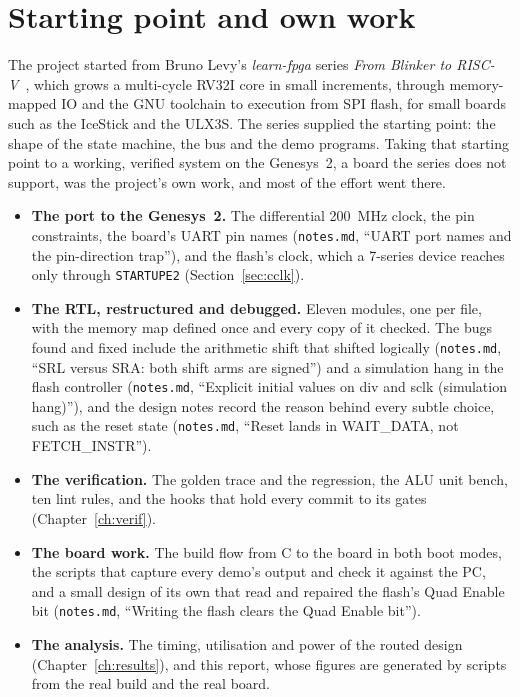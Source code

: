 \documentclass[11pt,a4paper]{report}
\newcommand{\notes}[1]{(\texttt{notes.md}, ``#1'')}
\begin{document}
\section{Starting point and own work}

The project started from Bruno Levy's \emph{learn-fpga} series \emph{From Blinker to
RISC-V}~\cite{levy-learnfpga}, which grows a multi-cycle RV32I core in small increments,
through memory-mapped IO and the GNU toolchain to execution from SPI flash, for small boards
such as the IceStick and the ULX3S. The series supplied the starting point: the shape of the
state machine, the bus and the demo programs. Taking that starting point to a working, verified
system on the Genesys~2, a board the series does not support, was the project's own work,
and most of the effort went there.

\begin{itemize}[leftmargin=*, itemsep=2pt]
  \item \textbf{The port to the Genesys~2.} The differential 200~MHz clock, the pin
    constraints, the board's UART pin names \notes{UART port names and the pin-direction trap},
    and the flash's
    clock, which a 7-series device reaches only through \texttt{STARTUPE2}
    (Section~\ref{sec:cclk}).
  \item \textbf{The RTL, restructured and debugged.} Eleven modules, one per file, with the
    memory map defined once and every copy of it checked. The bugs found and fixed include
    the arithmetic shift that shifted logically \notes{SRL versus SRA: both shift arms are
    signed} and a simulation hang in the flash controller \notes{Explicit initial values on div
    and sclk (simulation hang)}, and the design notes record the reason behind every subtle
    choice, such as the reset state \notes{Reset lands in WAIT\_DATA, not FETCH\_INSTR}.
  \item \textbf{The verification.} The golden trace and the regression, the ALU unit bench,
    ten lint rules, and the hooks that hold every commit to its gates
    (Chapter~\ref{ch:verif}).
  \item \textbf{The board work.} The build flow from C to the board in both boot modes, the
    scripts that capture every demo's output and check it against the PC, and a small design
    of its own that read and repaired the flash's Quad Enable bit \notes{Writing the flash
    clears the Quad Enable bit}.
  \item \textbf{The analysis.} The timing, utilisation and power of the routed design
    (Chapter~\ref{ch:results}), and this report, whose figures are generated by scripts from
    the real build and the real board.
\end{itemize}
\end{document}
